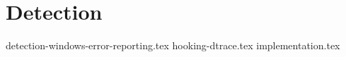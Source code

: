 \documentclass{report}
\begin{document}
\chapter{Detection}
\label{cha:detection}
{detection-windows-error-reporting.tex}
{hooking-dtrace.tex}
{implementation.tex}
\end{document}
